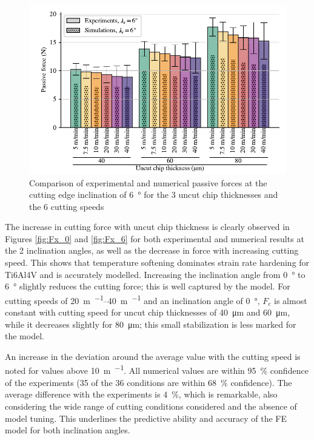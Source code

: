 \documentclass[preprint,12pt,times]{elsarticle}
\newcommand{\snsp}[2]{{#1}_{\!#2}}    %
\begin{document}
\begin{figure}[!h]
\centering
\includegraphics[width = 140 mm]{Figures/Fz_6}
\caption{Comparison of experimental and numerical passive forces at the cutting edge inclination of \qty{6}{\degree} for the 3 uncut chip thicknesses and the 6 cutting speeds}
\label{fig:Fz_6}
\end{figure}

The increase in cutting force with uncut chip thickness is clearly observed in Figures \ref{fig:Fx_0} and \ref{fig:Fx_6} for both experimental and numerical results at the 2 inclination angles, as well as the decrease in force with increasing cutting speed. This shows that temperature softening dominates strain rate hardening for Ti6Al4V and is accurately modelled. Increasing the inclination angle from \qty{0}{\degree} to \qty{6}{\degree} slightly reduces the cutting force; this is well captured by the model. For cutting speeds of \qtyrange{20}{40}{\m\per\min} and an inclination angle of \qty{0}{\degree}, $\snsp{F}{c}$ is almost constant with cutting speed for uncut chip thicknesses of \qty{40}{\um} and \qty{60}{\um}, while it decreases slightly for \qty{80}{\um}; this small stabilization is less marked for the model.

An increase in the deviation around the average value with the cutting speed is noted for values above \qty{10}{\m\per\min}. All numerical values are within \qty{95}{\%} confidence of the experiments (35 of the 36 conditions are within \qty{68}{\%} confidence). The average difference with the experiments is \qty{4}{\%}, which is remarkable, also considering the wide range of cutting conditions considered and the absence of model tuning. This underlines the predictive ability and accuracy of the FE model for both inclination angles.
\end{document}

